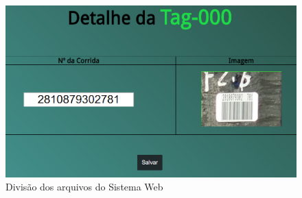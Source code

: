 \begin{figure}[htbp]
	\centering
	\includegraphics[width=0.8\linewidth]{figuras/WebService/Screens/detail_tag.png}
	\caption{Divisão dos arquivos do Sistema Web}
	\label{fig:cleanArchtecture}
\end{figure}